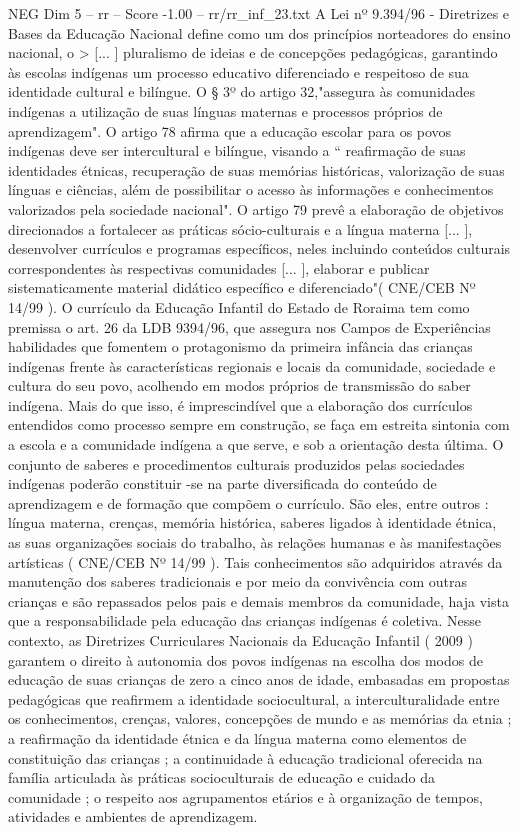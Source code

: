 \begin{textsample}{NEG Dim 5 – rr – Score -1.00 – rr/rr\_inf\_23.txt}
A Lei nº 9.394/96 - Diretrizes e Bases da Educação Nacional define como um dos princípios norteadores do ensino nacional, o > [... ] pluralismo de ideias e de concepções pedagógicas, garantindo às escolas indígenas um processo educativo diferenciado e respeitoso de sua identidade cultural e bilíngue.
O § 3º do artigo 32,"assegura às comunidades indígenas a utilização de suas línguas maternas e processos próprios de aprendizagem".
O artigo 78 afirma que a educação escolar para os povos indígenas deve ser intercultural e bilíngue, visando a “ reafirmação de suas identidades étnicas, recuperação de suas memórias históricas, valorização de suas línguas e ciências, além de possibilitar o acesso às informações e conhecimentos valorizados pela sociedade nacional".
O artigo 79 prevê a elaboração de objetivos direcionados a fortalecer as práticas sócio-culturais e a língua materna [... ], desenvolver currículos e programas específicos, neles incluindo conteúdos culturais correspondentes às respectivas comunidades [... ], elaborar e publicar sistematicamente material didático específico e diferenciado"( CNE/CEB Nº 14/99 ).
O currículo da Educação Infantil do Estado de Roraima tem como premissa o art. 26 da LDB 9394/96, que assegura nos Campos de Experiências habilidades que fomentem o protagonismo da primeira infância das crianças indígenas frente às características regionais e locais da comunidade, sociedade e cultura do seu povo, acolhendo em modos próprios de transmissão do saber indígena.
Mais do que isso, é imprescindível que a elaboração dos currículos entendidos como processo sempre em construção, se faça em estreita sintonia com a escola e a comunidade indígena a que serve, e sob a orientação desta última.
O conjunto de saberes e procedimentos culturais produzidos pelas sociedades indígenas poderão constituir -se na parte diversificada do conteúdo de aprendizagem e de formação que compõem o currículo.
São eles, entre outros : língua materna, crenças, memória histórica, saberes ligados à identidade étnica, as suas organizações sociais do trabalho, às relações humanas e às manifestações artísticas ( CNE/CEB Nº 14/99 ).
Tais conhecimentos são adquiridos através da manutenção dos saberes tradicionais e por meio da convivência com outras crianças e são repassados pelos pais e demais membros da comunidade, haja vista que a responsabilidade pela educação das crianças indígenas é coletiva.
Nesse contexto, as Diretrizes Curriculares Nacionais da Educação Infantil ( 2009 ) garantem o direito à autonomia dos povos indígenas na escolha dos modos de educação de suas crianças de zero a cinco anos de idade, embasadas em propostas pedagógicas que reafirmem a identidade sociocultural, a interculturalidade entre os conhecimentos, crenças, valores, concepções de mundo e as memórias da etnia ; a reafirmação da identidade étnica e da língua materna como elementos de constituição das crianças ; a continuidade à educação tradicional oferecida na família articulada às práticas socioculturais de educação e cuidado da comunidade ; o respeito aos agrupamentos etários e à organização de tempos, atividades e ambientes de aprendizagem.

\end{textsample}
